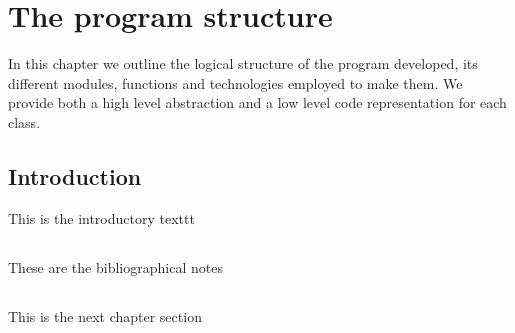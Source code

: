 %
%

\chapter{The program structure}

\begin{resumen}
In this chapter we outline the logical structure of the program developed, its different modules, functions and technologies employed to make them.
We provide both a high level abstraction and a low level code representation for each class.
\end{resumen}


\section{Introduction}
\label{cap1:sec:introduccion}

This is the introductory texttt

\section*{\NotasBibliograficas}
\TocNotasBibliograficas

These are the bibliographical notes
\citep{ldesc2e}

\medskip



\section*{\ProximoCapitulo}
\TocProximoCapitulo

This is the next chapter section

